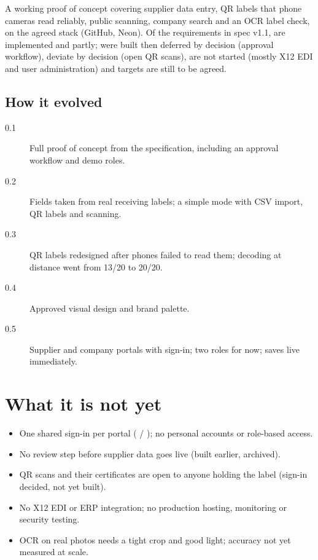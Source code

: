 \documentclass[11pt,a4paper]{article}
\begin{document}
\begin{keypoint}[In short]
A working proof of concept covering supplier data entry, QR labels that phone cameras read reliably, public scanning,
company search and an OCR label check, on the agreed stack (GitHub, Neon). Of the  requirements in
spec v1.1,  are implemented and  partly;  were built then deferred by decision
(approval workflow),  deviate by decision (open QR scans),  are not started (mostly X12 EDI and
user administration) and  targets are still to be agreed.
\end{keypoint}

\subsection{How it evolved}
\begin{description}
  \item[0.1] Full proof of concept from the specification, including an approval workflow and demo roles.
  \item[0.2] Fields taken from real receiving labels; a simple mode with CSV import, QR labels and scanning.
  \item[0.3] QR labels redesigned after phones failed to read them; decoding at distance went from 13/20 to 20/20.
  \item[0.4] Approved visual design and brand palette.
  \item[0.5] Supplier and company portals with sign-in; two roles for now; saves live immediately.
\end{description}

\section{What it is not yet}
\begin{caution}
\begin{itemize}
  \item One shared sign-in per portal ( / ); no personal accounts or role-based access.
  \item No review step before supplier data goes live (built earlier, archived).
  \item QR scans and their certificates are open to anyone holding the label (sign-in decided, not yet built).
  \item No X12 EDI or ERP integration; no production hosting, monitoring or security testing.
  \item OCR on real photos needs a tight crop and good light; accuracy not yet measured at scale.
\end{itemize}
\end{caution}
\end{document}
